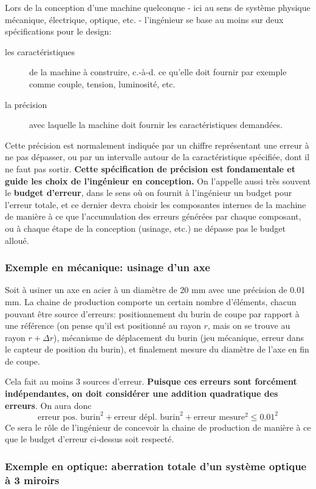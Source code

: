 \documentclass[main.tex]{subfiles}
\begin{document}
Lors de la conception d'une machine quelconque - ici au sens de système physique mécanique, électrique, optique, etc. - l'ingénieur se base au moins sur deux spécifications pour le design:
\begin{description}
    \item[les caractéristiques] de la machine à construire, c.-à-d. ce qu'elle doit fournir par exemple comme couple, tension, luminosité, etc.
    \item[la précision] avec laquelle la machine doit fournir les caractéristiques demandées.
\end{description}
Cette précision est normalement indiquée par un chiffre représentant une erreur à ne pas dépasser, ou par un intervalle autour de la caractéristique spécifiée, dont il ne faut pas sortir. \textbf{Cette spécification de précision est fondamentale et guide les choix de l'ingénieur en conception.} On l'appelle aussi très souvent le \textbf{budget d'erreur}, dans le sens où on fournit à l'ingénieur un budget pour l'erreur totale, et ce dernier devra choisir les composantes internes de la machine de manière à ce que l'accumulation des erreurs générées par chaque composant, ou à chaque étape de la conception (usinage, etc.) ne dépasse pas le budget alloué.

\subsubsection*{Exemple en mécanique: usinage d'un axe}

Soit à usiner un axe en acier à un diamètre de 20 mm avec une précision de 0.01 mm. La chaine de production comporte un certain nombre d'éléments, chacun pouvant être source d'erreurs: positionnement du burin de coupe par rapport à une référence (on pense qu'il est positionné au rayon $r$, mais on se trouve au rayon $r+\Delta r$), mécanisme de déplacement du burin (jeu mécanique, erreur dans le capteur de position du burin), et finalement mesure du diamètre de l'axe en fin de coupe.

Cela fait au moins 3 sources d'erreur. \textbf{Puisque ces erreurs sont forcément indépendantes, on doit considérer une addition quadratique des erreurs}. On aura donc
$$
    \text{erreur pos. burin}^2+\text{erreur dépl. burin}^2+\text{erreur mesure}^2\le0.01^2
$$
Ce sera le rôle de l'ingénieur de concevoir la chaine de production de manière à ce que le budget d'erreur ci-dessus soit respecté.

\subsubsection*{Exemple en optique: aberration totale d'un système optique à 3 miroirs}
\end{document}
